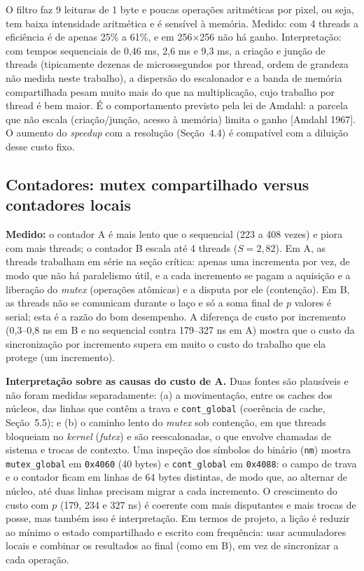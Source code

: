 \documentclass[12pt,a4paper]{article}
\newcommand{\tx}{$\times$}
\begin{document}
O filtro faz 9 leituras de 1 byte e poucas operações aritméticas por pixel, ou seja, tem baixa intensidade aritmética e é sensível à memória. Medido: com 4 threads a eficiência é de apenas 25\% a 61\%, e em 256\tx256 não há ganho. Interpretação: com tempos sequenciais de 0,46 ms, 2,6 ms e 9,3 ms, a criação e junção de threads (tipicamente dezenas de microssegundos por thread, ordem de grandeza não medida neste trabalho), a dispersão do escalonador e a banda de memória compartilhada pesam muito mais do que na multiplicação, cujo trabalho por thread é bem maior. É o comportamento previsto pela lei de Amdahl: a parcela que não escala (criação/junção, acesso à memória) limita o ganho [Amdahl 1967]. O aumento do \emph{speedup} com a resolução (Seção~4.4) é compatível com a diluição desse custo fixo.

\subsection{Contadores: mutex compartilhado versus contadores locais}

\textbf{Medido:} o contador A é mais lento que o sequencial (223 a 408 vezes) e piora com mais threads; o contador B escala até 4 threads ($S=2{,}82$). Em A, as threads trabalham em série na seção crítica: apenas uma incrementa por vez, de modo que não há paralelismo útil, e a cada incremento se pagam a aquisição e a liberação do \emph{mutex} (operações atômicas) e a disputa por ele (contenção). Em B, as threads não se comunicam durante o laço e só a soma final de $p$ valores é serial; esta é a razão do bom desempenho. A diferença de custo por incremento (0,3--0,8 ns em B e no sequencial contra 179--327 ns em A) mostra que o custo da sincronização por incremento supera em muito o custo do trabalho que ela protege (um incremento).

\textbf{Interpretação sobre as causas do custo de A.} Duas fontes são plausíveis e não foram medidas separadamente: (a) a movimentação, entre os caches dos núcleos, das linhas que contêm a trava e \texttt{cont\_global} (coerência de cache, Seção~5.5); e (b) o caminho lento do \emph{mutex} sob contenção, em que threads bloqueiam no \emph{kernel} (\emph{futex}) e são reescalonadas, o que envolve chamadas de sistema e trocas de contexto. Uma inspeção dos símbolos do binário (\texttt{nm}) mostra \texttt{mutex\_global} em \texttt{0x4060} (40 bytes) e \texttt{cont\_global} em \texttt{0x4088}: o campo de trava e o contador ficam em linhas de 64 bytes distintas, de modo que, ao alternar de núcleo, até duas linhas precisam migrar a cada incremento. O crescimento do custo com $p$ (179, 234 e 327 ns) é coerente com mais disputantes e mais trocas de posse, mas também isso é interpretação. Em termos de projeto, a lição é reduzir ao mínimo o estado compartilhado e escrito com frequência: usar acumuladores locais e combinar os resultados ao final (como em B), em vez de sincronizar a cada operação.
\end{document}
